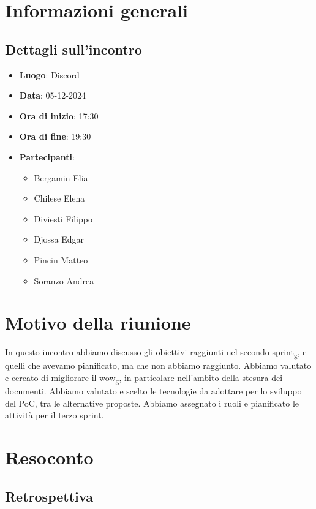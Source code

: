 \section{Informazioni generali}
    \subsection{Dettagli sull'incontro}
        \begin{itemize}
            \item \textbf{Luogo}: Discord
            \item \textbf{Data}: 05-12-2024
            \item \textbf{Ora di inizio}: 17:30
            \item \textbf{Ora di fine}: 19:30
            \item \textbf{Partecipanti}:
                \begin{itemize}
                    \item Bergamin Elia
                    \item Chilese Elena
                    \item Diviesti Filippo
                    \item Djossa Edgar
                    \item Pincin Matteo
                    \item Soranzo Andrea
                \end{itemize}
        \end{itemize}

\section{Motivo della riunione}
    In questo incontro abbiamo discusso gli obiettivi raggiunti nel secondo sprint\textsubscript{g},
    e quelli che avevamo pianificato, ma che non abbiamo raggiunto. 
    Abbiamo valutato e cercato di migliorare il wow\textsubscript{g}, in particolare
    nell'ambito della stesura dei documenti. 
    Abbiamo valutato e scelto le tecnologie da adottare per lo sviluppo del PoC, 
    tra le alternative proposte.
    Abbiamo assegnato i ruoli e pianificato le attività per il terzo sprint.

\section{Resoconto}
    \subsection{Retrospettiva}

